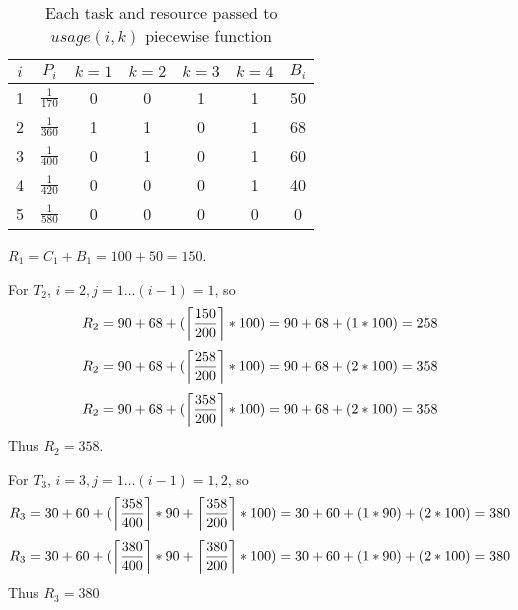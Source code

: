 \documentclass[10pt]{article}
\DeclarePairedDelimiter\ceil{\lceil}{\rceil}
\begin{document}
\begin{table}[H]
    \centering
    \begin{tabular}{|c|c|c|c|c|c|c|}
        \hline
        \textcolor{darkpink}{$i$} & \textcolor{darkpink}{\textit{$P_i$}} & \textcolor{darkpink}{$k = 1$} & \textcolor{darkpink}{$k = 2$} & \textcolor{darkpink}{$k = 3$} & \textcolor{darkpink}{$k = 4$} & \textcolor{darkpink}{$B_i$} \\
        \hline

        1 & $\frac{1}{170}$ & 0 & 0 & 1 & 1 & 50 \\
        \hline

        2 & $\frac{1}{360}$ & 1 & 1 & 0 & 1 & 68 \\
        \hline

        3 & $\frac{1}{400}$ & 0 & 1 & 0 & 1 & 60 \\
        \hline

        4 & $\frac{1}{420}$ & 0 & 0 & 0 & 1 & 40 \\
        \hline

        5 & $\frac{1}{580}$ & 0 & 0 & 0 & 0 & 0 \\
        \hline
    \end{tabular}

    \caption{Each task and resource passed to $usage(i,k)$ piecewise function}
    \label{tab:task_resources}
\end{table}

$R_1 = C_1 + B_1 = 100 + 50 = 150$.

For $T_2$, $i=2, j=1\dots (i-1) = 1$, so
\begin{equation}
    R_2 = 90 + 68 + (\ceil*{\frac{150}{200}} * 100) = 90 + 68 + (1 * 100) = 258
\end{equation}
\begin{equation}
    R_2 = 90 + 68 + (\ceil*{\frac{258}{200}} * 100) = 90 + 68 + (2 * 100) = 358
\end{equation}
\begin{equation}
    R_2 = 90 + 68 + (\ceil*{\frac{358}{200}} * 100) = 90 + 68 + (2 * 100) = 358
\end{equation}
Thus $R_2 = 358$.

\newpage
For $T_3$, $i=3, j=1\dots (i-1) = 1,2$, so
\begin{equation}
    R_3 = 30 + 60 + (\ceil*{\frac{358}{400}} * 90 + \ceil*{\frac{358}{200}} * 100) = 30 + 60 + (1 * 90) + (2 * 100) = 380 
\end{equation}
\begin{equation}
    R_3 = 30 + 60 + (\ceil*{\frac{380}{400}} * 90 + \ceil*{\frac{380}{200}} * 100) = 30 + 60 + (1 * 90) + (2 * 100) = 380 
\end{equation}
Thus $R_3 = 380$
\end{document}
